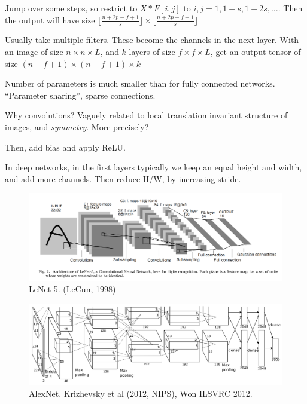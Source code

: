 \documentclass[english]{article}
\begin{document}
Jump over some steps, so restrict to $X * F[i,j]$ to $i,j=1,1+s,1+2s,\ldots$.
Then the output will have size $\lfloor \frac{n+2p-f+1}{s}\rfloor \times \lfloor \frac{n+2p-f+1}{s}\rfloor$

\item Usually take multiple filters. These become the channels in the next layer. With an image of size $n \times n \times L$, and $k$ layers of size 
$f \times f \times L$, get  an output tensor of size $(n-f+1) \times (n-f+1) \times k$ 


Number of parameters is much smaller than for fully connected networks. ``Parameter sharing'', sparse connections. %

Why convolutions? Vaguely related to local translation invariant structure of images, and \emph{symmetry}. %
More precisely?


\item Then, add bias and apply ReLU. 
 
In deep networks, in the first layers typically we keep an equal height and width, and add more channels. Then reduce H/W, by increasing stride. %

\begin{figure}
  \centering
  \includegraphics[scale=0.3]{lenet.png}
  \caption{LeNet-5. (LeCun, 1998)}
  \label{lenet5}
\end{figure}


\begin{figure}
  \centering
  \includegraphics[scale=0.75]{a.png}
  \caption{AlexNet. Krizhevsky et al (2012, NIPS), Won ILSVRC 2012.}
  \label{AlexNet}
\end{figure}
\end{document}
